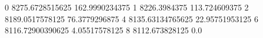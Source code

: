 0 8275.6728515625 162.9990234375
1 8226.3984375 113.724609375
2 8189.0517578125 76.3779296875
4 8135.63134765625 22.95751953125
6 8116.72900390625 4.05517578125
8 8112.673828125 0.0
